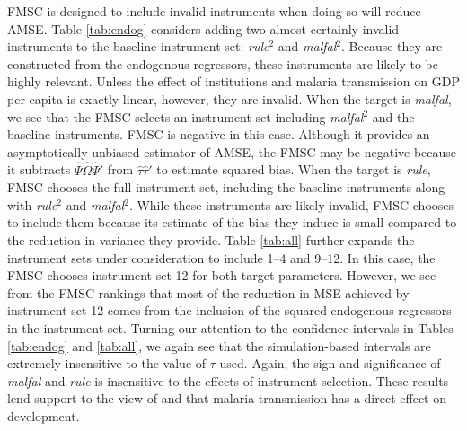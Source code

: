 FMSC is designed to include invalid instruments when doing so will reduce AMSE. Table \ref{tab:endog} considers adding two almost certainly invalid instruments to the baseline instrument set: \emph{rule}$^2$ and \emph{malfal}$^2$. Because they are constructed from the endogenous regressors, these instruments are likely to be highly relevant. Unless the effect of institutions and malaria transmission on GDP per capita is exactly linear, however, they are invalid. When the target is \emph{malfal}, we see that the FMSC selects an instrument set including \emph{malfal}$^2$ and the baseline instruments. FMSC is negative in this case. Although it provides an asymptotically unbiased estimator of AMSE, the FMSC may be negative because it subtracts $\widehat{\Psi}\widehat{\Omega}\widehat{\Psi}'$ from $\widehat{\tau}\widehat{\tau}'$ to estimate squared bias. When the target is \emph{rule}, FMSC chooses the full instrument set, including the baseline instruments along with \emph{rule}$^2$ and \emph{malfal}$^2$. While these instruments are likely invalid, FMSC chooses to include them because its estimate of the bias they induce is small compared to the reduction in variance they provide. Table \ref{tab:all} further expands the instrument sets under consideration to include 1--4 and 9--12. In this case, the FMSC chooses instrument set 12 for both target parameters. However, we see from the FMSC rankings that most of the reduction in MSE achieved by instrument set 12 comes from the inclusion of the squared endogenous regressors in the instrument set. Turning our attention to the confidence intervals in Tables \ref{tab:endog} and \ref{tab:all}, we again see that the simulation-based intervals are extremely insensitive to the value of $\tau$ used. Again, the sign and significance of \emph{malfal} and \emph{rule} is insensitive to the effects of instrument selection. These results lend support to the view of \cite{Carstensen2006} and \cite{Sachs} that malaria transmission has a direct effect on development.

